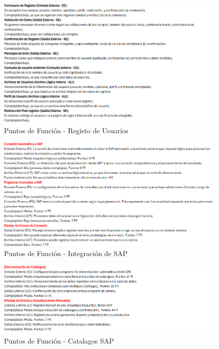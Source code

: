 \documentclass[12pt,letterpaper,spanish, xcolor=table]{report}
\numberwithin{figure}{subsection}
\begin{document}
	\begin{figure}[H]
		\centering
		\includegraphics[width=1.0\textwidth]
		{Imagenes/PathAyuda/FpsRegistroUsuario.png}
		\caption{Puntos de Función - Registo de Usuarios}\label{a2}
	\end{figure}

	\begin{figure}[H]
		\centering
		\includegraphics[width=1.0\textwidth]
		{Imagenes/PathAyuda/FpsIntegracionSAP.png}
		\caption{Puntos de Función - Integración de SAP}\label{a2}
	\end{figure}

	\begin{figure}[H]
		\centering
		\includegraphics[width=1.0\textwidth]
		{Imagenes/PathAyuda/FpsCatalagoSAP.png}
		\caption{Puntos de Función - Catalagos SAP}\label{a2}
	\end{figure}
	
\end{document}
